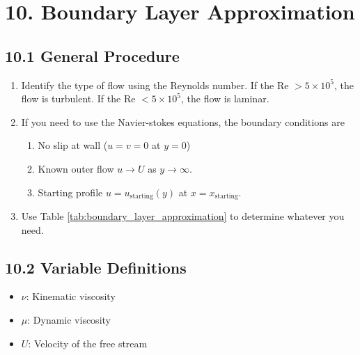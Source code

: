\section*{10. Boundary Layer Approximation}
\subsection*{10.1 General Procedure}
\begin{enumerate}
    \item Identify the type of flow using the Reynolds number. If the Re $> 5 \times 10^5$, the flow is turbulent. If the Re $< 5 \times 10^5$, the flow is laminar.
    \item If you need to use the Navier-stokes equations, the boundary conditions are 
    \begin{enumerate}[label=\roman*)]
        \item No slip at wall ($u = v = 0$ at $y = 0$) 
        \item Known outer flow $u \to U$ as $y \to \infty$.
        \item Starting profile $u = u_{\text{starting}}(y)$ at $x = x_{\text{starting}}$.
    \end{enumerate}
    \item Use Table \ref{tab:boundary_layer_approximation} to determine whatever you need.
\end{enumerate}

\subsection*{10.2 Variable Definitions}
\begin{itemize}
    \item $\nu$: Kinematic viscosity
    \item $\mu$: Dynamic viscosity
    \item $U$: Velocity of the free stream
\end{itemize}


